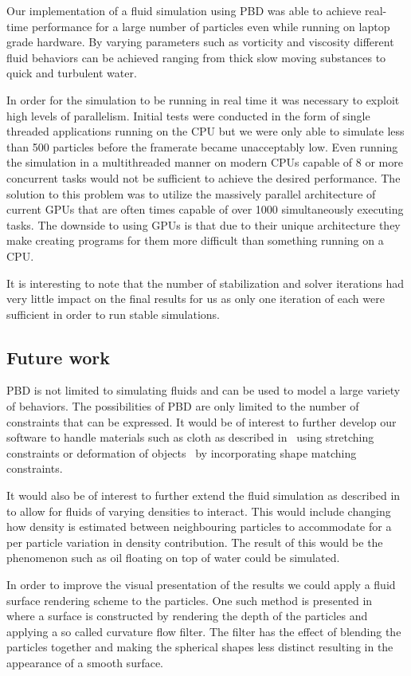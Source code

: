 Our implementation of a fluid simulation using PBD was able
to achieve real-time performance for a large number of particles even while
running on laptop grade hardware. By varying parameters such as vorticity and
viscosity different fluid behaviors can be achieved ranging from thick slow
moving substances to quick and turbulent water.

In order for the simulation to be running in real time it was necessary to
exploit high levels of parallelism. Initial tests were conducted in the form
of single threaded applications running on the CPU but we were only able to
simulate less than 500 particles before the framerate became unacceptably low.
Even running the simulation in a multithreaded manner on modern CPUs capable of
8 or more concurrent tasks would not be sufficient to achieve the desired
performance. The solution to this problem was to utilize the massively parallel
architecture of current GPUs that are often times
capable of over 1000 simultaneously executing tasks. The downside to using GPUs
is that due to their unique architecture they make creating programs for them
more difficult than something running on a CPU.

It is interesting to note that the number of stabilization and solver iterations had very little impact on the final results for us as only one iteration of each were sufficient in order to run stable simulations.

\subsection{Future work}
PBD is not limited to simulating
fluids and can be used to model a large variety of behaviors. The possibilities
of PBD are only limited to the number of constraints that
can be expressed. It would be of interest to further develop our software to
handle materials such as cloth as described in~\cite{muller2007position} using
stretching constraints or deformation of objects~\cite{muller2005meshless} by
incorporating shape matching constraints.

It would also be of interest to further extend the fluid simulation as
described in~\cite{macklin2014unified} to allow for fluids of varying densities
to interact. This would include changing how density is estimated between
neighbouring particles to accommodate for a per particle variation in density
contribution. The result of this would be the phenomenon such as oil floating
on top of water could be simulated.

In order to improve the visual presentation of the results we could apply a
fluid surface rendering scheme to the particles. One such method is presented
in~\cite{van2009screen} where a surface is constructed by rendering the depth
of the particles and applying a so called curvature flow filter. The filter has
the effect of blending the particles together and making the spherical shapes
less distinct resulting in the appearance of a smooth surface.
